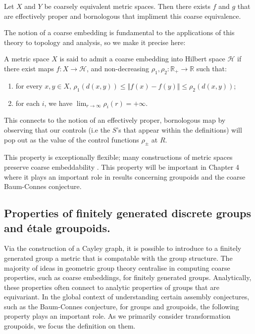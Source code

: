 \begin{lemma}
Let $X$ and $Y$ be coarsely equivalent metric spaces. Then there exists $f$ and $g$ that are effectively proper and bornologous that impliment this coarse equivalence.
\end{lemma}

The notion of a coarse embedding is fundamental to the applications of this theory to topology and analysis, so we make it precise here:

\begin{definition}\label{def:FCE}
A metric space $X$ is said to admit a coarse embedding into Hilbert space $\mathcal{H}$ if there exist maps $f:X \rightarrow \mathcal{H}$,  and non-decreasing $\rho_{1},\rho_{2}:\mathbb{R}_{+} \rightarrow \mathbb{R}$ such that:
\begin{enumerate}
\item for every $x,y \in X$, $\rho_{1}(d(x,y)) \leq \Vert f(x) - f(y) \Vert \leq \rho_{2}(d(x,y))$;
\item for each $i$, we have $\lim_{r \rightarrow \infty}\rho_{i}(r) = +\infty$.
\end{enumerate}
\end{definition}

This connects to the notion of an effectively proper, bornologous map by observing that our controls (i.e the $S$'s that appear within the definitions) will pop out as the value of the control functions $\rho_{\pm}$ at $R$.

This property is exceptionally flexible; many constructions of metric spaces preserve coarse embeddability \cite{EG-permanence}. This property will be important in Chapter 4 where it plays an important role in results concerning groupoids and the coarse Baum-Connes conjecture.

\subsection{Properties of finitely generated discrete groups and \'etale groupoids.}
Via the construction of a Cayley graph, it is possible to introduce to a finitely generated group a metric that is compatable with the group structure. The majority of ideas in geometric group theory centralise in computing coarse properties, such as coarse embeddings, for finitely generated groups. Analytically, these properties often connect to analytic properties of groups that are equivariant. In the global context of understanding certain assembly conjectures, such as the Baum-Connes conjecture, for groups and groupoids, the following property plays an important role. As we primarily consider transformation groupoids, we focus the definition on them.

